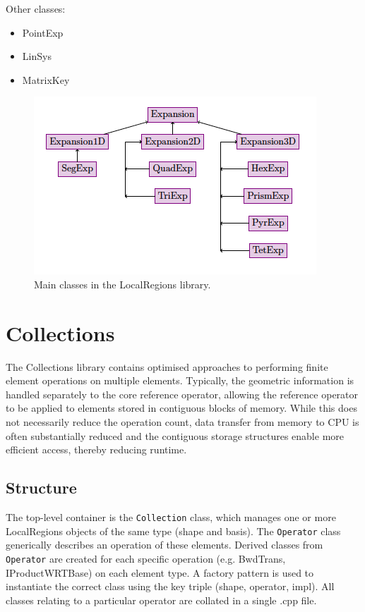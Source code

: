 Other classes:
\begin{itemize}
\item PointExp
\item LinSys
\item MatrixKey
\end{itemize}

\begin{figure}
\centering
\includegraphics[width=\textwidth]{img/LocalRegions.png}
\caption{Main classes in the LocalRegions library.}
\label{f:library:localregions}
\end{figure}

\section{Collections}
The Collections library contains optimised approaches to performing finite
element operations on multiple elements. Typically, the geometric information is
handled separately to the core reference operator, allowing the reference
operator to be applied to elements stored in contiguous blocks of memory. While
this does not necessarily reduce the operation count, data transfer from
memory to CPU is often substantially reduced and the contiguous storage
structures enable more efficient access, thereby reducing runtime.

\subsection{Structure}
The top-level container is the \texttt{Collection} class, which manages one or
more LocalRegions objects of the same type (shape and basis). The
\texttt{Operator} class generically describes an operation of these elements.
Derived classes from \texttt{Operator} are created for each specific operation
(e.g. BwdTrans, IProductWRTBase) on each element type. A factory pattern is used
to instantiate the correct class using the key triple (shape, operator, impl).
All classes relating to a particular operator are collated in a single .cpp
file.

